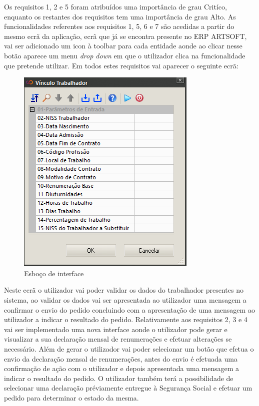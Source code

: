 \documentclass[sigplan]{acmart}
\begin{document}
Os requisitos 1, 2 e 5 foram atribuídos uma importância de grau Critíco, enquanto os restantes dos requisitos tem uma importância de grau Alto. As funcionalidades referentes aos requisitos 1, 5, 6 e 7 são acedidas a partir do mesmo ecrã da aplicação, ecrã que já se encontra presente no ERP ARTSOFT, vai ser adicionado um icon à toolbar para cada entidade aonde ao clicar nesse botão aparece um menu \textit{drop down} em que o utilizador clica na funcionalidade que pretende utilizar. Em todos estes requisitos vai aparecer o seguinte ecrã:
\FloatBarrier
\begin{figure}[htbp]
	\centerline{\includegraphics[width=\linewidth]{figures/esboco_interface.png}}
	\caption{Esboço de interface}
	\label{fig4}
\end{figure}
\FloatBarrier
Neste ecrã o utilizador vai poder validar os dados do trabalhador presentes no sistema, ao validar os dados vai ser apresentada ao utilizador uma mensagem a confirmar o envio do pedido concluindo com a apresentação de uma mensagem ao utilizador a indicar o resultado do pedido. Relativamente aos requisitos 2, 3 e 4 vai ser implementado uma nova interface aonde o utilizador pode gerar e visualizar a sua declaração mensal de renumerações e efetuar alterações se necessário. Além de gerar o utilizador vai poder selecionar um botão que efetua o envio da declaração mensal de renumerações, antes do envio é efetuada uma confirmação de ação com o utilizador e depois apresentada uma mensagem a indicar o resultado do pedido. O utilizador também terá a possibilidade de selecionar uma declaração préviamente entregue à Segurança Social e efetuar um pedido para determinar o estado da mesma.
\end{document}
